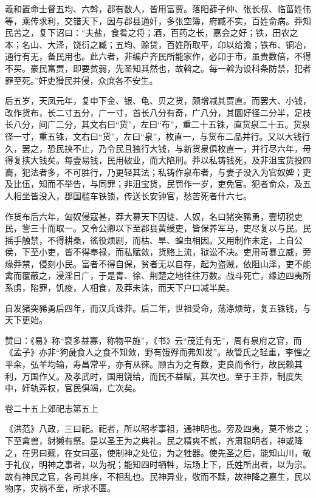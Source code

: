 \documentclass[12pt,UTF8]{ctexbook}
\begin{document}
羲和置命士督五均、六斡，郡有数人，皆用富贾。落阳薛子仲、张长叔、临菑姓伟等，乘传求利，交错天下，因与郡县通奸，多张空簿，府臧不实，百姓俞病。莽知民苦之，复下诏曰：“夫盐，食肴之将；酒，百药之长，嘉会之好；铁，田农之本；名山、大泽，饶衍之臧；五均、赊贷，百姓所取平，卬以给澹；铁布、铜冶，通行有无，备民用也。此六者，非编户齐民所能家作，必卬于市，虽贵数倍，不得不买。豪民富贾，即要贫弱，先圣知其然也，故斡之。每一斡为设科条防禁，犯者罪至死。”奸吏猾民并侵，众庶各不安生。



后五岁，天凤元年，复申下金、银、龟、贝之货，颇增减其贾直。而罢大、小钱，改作货布，长二寸五分，广一寸，首长八分有奇，广八分，其圜好径二分半，足枝长八分，间广二分，其文右曰“货”，左曰“布”，重二十五铢，直货泉二十五。货泉径一寸，重五铢，文右曰“货”，左曰“泉”，枚直一，与货布二品并行。又以大钱行久，罢之，恐民挟不止，乃令民且独行大钱，与新货泉俱枚直一，并行尽六年，毋得复挟大钱矣。每壹易钱，民用破业，而大陷刑。莽以私铸钱死，及非沮宝货投四裔，犯法者多，不可胜行，乃更轻其法；私铸作泉布者，与妻子没入为官奴婢；吏及比伍，知而不举告，与同罪；非沮宝货，民罚作一岁，吏免官。犯者俞众，及五人相坐皆没入，郡国槛车铁锁，传送长安钟官，愁苦死者什六七。



作货布后六年，匈奴侵寇甚，莽大募天下囚徒、人奴，名曰猪突豨勇，壹切税吏民，訾三十而取一。又令公卿以下至郡县黄绶吏，皆保养军马，吏尽复以与民。民摇手触禁，不得耕桑，徭役烦剧，而枯、旱、蝗虫相因。又用制作未定，上自公侯，下至小吏，皆不得奉禄，而私赋敛，货赂上流，狱讼不决。吏用苛暴立威，旁缘莽禁，侵刻小民。富者不得自保，贫者无以自存，起为盗贼，依阻山泽，吏不能禽而覆蔽之，浸淫日广，于是青、徐、荆楚之地往往万数。战斗死亡，缘边四夷所系虏，陷罪，饥疫，人相食，及莽未诛，而天下户口减半矣。



自发猪突豨勇后四年，而汉兵诛莽。后二年，世祖受命，荡涤烦苛，复五铢钱，与天下更始。



赞曰：《易》称“裒多益寡，称物平施”，《书》云“茂迁有无”，周有泉府之官，而《孟子》亦非“狗彘食人之食不知敛，野有饿殍而弗知发”。故管氏之轻重，李悝之平籴，弘羊均输，寿昌常平，亦有从徠。顾古为之有数，吏良而令行，故民赖其利，万国作乂。及孝武时，国用饶给，而民不益赋，其次也。至于王莽，制度失中，奸轨弄权，官民俱竭，亡次矣。





卷二十五上郊祀志第五上



《洪范》八政，三曰祀。祀者，所以昭孝事祖，通神明也。旁及四夷，莫不修之；下至禽兽，豺獭有祭。是以圣王为之典礼。民之精爽不贰，齐肃聪明者，神或降之，在男曰觋，在女曰巫，使制神之处位，为之牲器。使先圣之后，能知山川，敬于礼仪，明神之事者，以为祝；能知四时牺牲，坛场上下，氏姓所出者，以为宗。故有神民之官，各司其序，不相乱也。民神异业，敬而不黩，故神降之嘉生，民以物序，灾祸不至，所求不匮。
\end{document}
